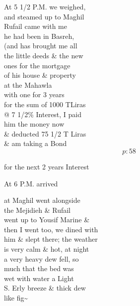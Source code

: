 \documentclass{report}
\begin{document}
	\par{
 	At 5 1/2 P.M. we weighed,\ \\and steamed up to Maghil\ \\Rufail came with me\ \\he had been in Basreh,\ \\(and has brought me all\ \\the little deeds \& the new\ \\ones for the mortgage\ \\of his house \& property\ \\at the Mahawla\ \\with one for 3 years\ \\for the sum of 1000 TLiras\ \\@ 7 1/2\% Interest, I paid\ \\him the money now\ \\\& deducted 75 1/2 T Liras\ \\\& am taking a Bond\ \\
  \[p: 58 \]

	}



	\par{
 	for the next 2 years Interest\ \\
	}

	\par{
 	At 6 P.M. arrived\ \\
	}

	\par{
 	at Maghil went alongside\ \\the Mejidieh \& Rufail\ \\went up to Yousif Marine \&\ \\then I went too, we dined with\ \\him \& slept there; the weather\ \\is very calm \& hot, at night\ \\a very heavy dew fell, so\ \\much that the bed was\ \\wet with water a Light\ \\S. Erly breeze \& thick dew\ \\like fig\~{}\ \\
	}
\end{document}
